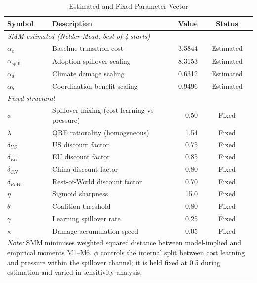 \begin{table}[htbp]
\centering
\small
\caption{Estimated and Fixed Parameter Vector}
\label{tab:smm_alphas}
\begin{tabular}{llrc}
\toprule
\textbf{Symbol} & \textbf{Description} & \textbf{Value} & \textbf{Status} \\
\midrule
\multicolumn{4}{l}{\textit{SMM-estimated (Nelder-Mead, best of 4 starts)}} \\[2pt]
$\alpha_c$ & Baseline transition cost        & 3.5844 & Estimated \\
$\alpha_{\text{spill}}$ & Adoption spillover scaling & 8.3153 & Estimated \\
$\alpha_d$ & Climate damage scaling          & 0.6312 & Estimated \\
$\alpha_b$ & Coordination benefit scaling    & 0.9496 & Estimated \\[6pt]
\multicolumn{4}{l}{\textit{Fixed structural}} \\[2pt]
$\phi$     & Spillover mixing (cost-learning vs pressure) & 0.50 & Fixed \\
$\lambda$  & QRE rationality (homogeneous)   & 1.54   & Fixed \\
$\delta_{US}$  & US discount factor          & 0.75   & Fixed \\
$\delta_{EU}$  & EU discount factor          & 0.85   & Fixed \\
$\delta_{CN}$  & China discount factor       & 0.80   & Fixed \\
$\delta_{RoW}$ & Rest-of-World discount factor & 0.70 & Fixed \\
$\eta$     & Sigmoid sharpness               & 15.0   & Fixed \\
$\theta$   & Coalition threshold             & 0.80   & Fixed \\
$\gamma$   & Learning spillover rate         & 0.25   & Fixed \\
$\kappa$   & Damage accumulation speed       & 0.05   & Fixed \\
\bottomrule
\multicolumn{4}{p{10cm}}{\footnotesize \textit{Note:} SMM minimises weighted squared distance between model-implied and empirical moments M1--M6. $\phi$ controls the internal split between cost learning and pressure within the spillover channel; it is held fixed at 0.5 during estimation and varied in sensitivity analysis.}
\\
\end{tabular}
\end{table}
